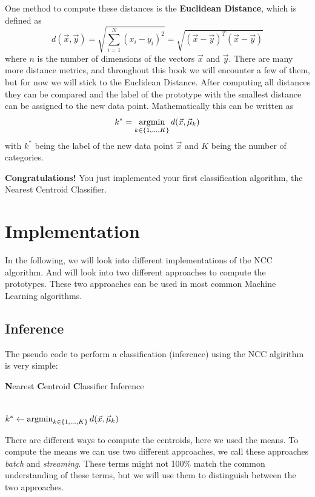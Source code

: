 One method to compute these distances is the \textbf{Euclidean Distance}, which is defined as
\begin{equation}
  d(\vec{x}, \vec{y}) = \sqrt{\sum_{i=1}^{N} (x_i - y_i)^2} = \sqrt{(\vec{x} - \vec{y})^T (\vec{x} - \vec{y})}
\end{equation}
where $n$ is the number of dimensions of the vectors $\vec{x}$ and $\vec{y}$.
There are many more distance metrics, and throughout this book we will encounter a few of them, but for now we will stick to the Euclidean Distance.
After computing all distances they can be compared and the label of the prototype with the smallest distance can be assigned to the new data point.
Mathematically this can be written as
\begin{equation}
  k^* = \argmin_{k\in\{1,\dots,K\}} d(\vec{x}, \vec{\mu}_k)
  \label{eq:nearest_centroid_inference}
\end{equation}
with $k^*$ being the label of the new data point $\vec{x}$ and $K$ being the number of categories.

\textbf{Congratulations!} You just implemented your first classification algorithm, the Nearest Centroid Classifier.
\section{Implementation}
In the following, we will look into different implementations of the NCC algorithm. And will look into two different approaches to compute the prototypes.
These two approaches can be used in most common Machine Learning algorithms.

\subsection{Inference}
The pseudo code to perform a classification (inference) using the NCC algirithm is very simple:
\begin{algorithm}
\LinesNumbered
\caption{\textbf{N}earest \textbf{C}entroid \textbf{C}lassifier Inference}\label{alg:ncc}
\\
$k^* \gets \argmin_{k\in\{1,\dots,K\}} d(\vec{x}, \vec{\mu}_k)$\;
\end{algorithm}

There are different ways to compute the centroids, here we used the means.
To compute the means we can use two different approaches, we call these approaches \textit{batch} and \textit{streaming}.
These terms might not 100\% match the common understanding of these terms, but we will use them to distinguish between the two approaches.

